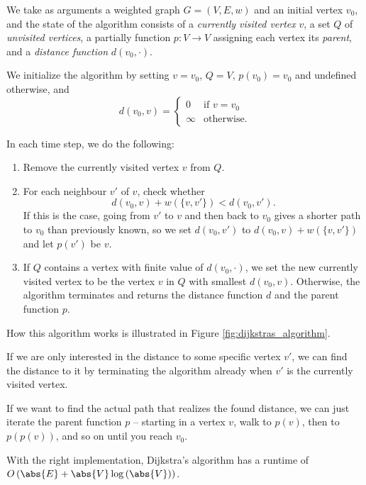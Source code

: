 \documentclass[nobib]{tufte-handout}
\begin{document}
\begin{definition}
  We take as arguments a weighted graph $G = (V,E,w)$ and an initial vertex $v_0$, and the state of the algorithm consists of a \emph{currently visited vertex} $v$, a set $Q$ of \emph{unvisited vertices}, a partially function $p: V \to V$ assigning each vertex its \emph{parent}, and a \emph{distance function} $d(v_0, \cdot)$. 
  
  We initialize the algorithm by setting $v = v_0$, $Q = V$, $p(v_0) = v_0$ and undefined otherwise, and
  $$d(v_0, v) = \begin{cases}
    0&\text{if }v=v_0\\
    \infty&\text{otherwise.}
  \end{cases}$$

  In each time step, we do the following:
  \begin{enumerate}
    \item Remove the currently visited vertex $v$ from $Q$.
    \item For each neighbour $v'$ of $v$, check whether
          $$d(v_0, v) + w(\{v, v'\}) < d(v_0, v').$$
          If this is the case, going from $v'$ to $v$ and then back to $v_0$ gives a shorter path to $v_0$ than previously known, so we set $d(v_0, v')$ to $d(v_0, v) + w(\{v, v'\})$ and let $p(v')$ be $v$.
    \item If $Q$ contains a vertex with finite value of $d(v_0, \cdot)$, we set the new currently visited vertex to be the vertex $v$ in $Q$ with smallest $d(v_0,v)$. Otherwise, the algorithm terminates and returns the distance function $d$ and the parent function $p$.
  \end{enumerate}

  How this algorithm works is illustrated in Figure \ref{fig:dijkstras_algorithm}.
\end{definition}

\begin{remark}
  If we are only interested in the distance to some specific vertex $v'$, we can find the distance to it by terminating the algorithm already when $v'$ is the currently visited vertex.

  If we want to find the actual path that realizes the found distance, we can just iterate the parent function $p$ -- starting in a vertex $v$, walk to $p(v)$, then to $p(p(v))$, and so on until you reach $v_0$.

  With the right implementation, Dijkstra's algorithm has a runtime of $O\left(\abs{E} + \abs{V}\log\left(\abs{V}\right)\right)$.
\end{remark}
\end{document}
